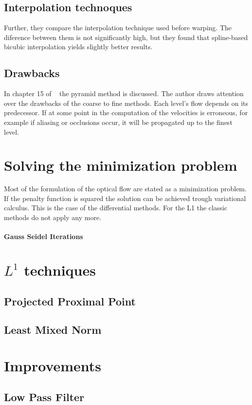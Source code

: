 \documentclass[12pt,a4paper,twoside]{report}
\begin{document}
\subsection{Interpolation technoques} Further, they compare the interpolation technique used before warping.
The diference between them is not significantly high, but they found that spline-based bicubic interpolation yields slightly better results.

\subsection{Drawbacks}In chapter 15 of ~\cite{fleet2006} the pyramid method is discussed. The author draws attention over the drawbacks of the coarse to fine methods. Each level's flow depends on its predecessor. If at some point in the computation of the velocities is erroneous, for example if aliasing or occlusions occur, it will be propagated up to the finest level.
 
\section{Solving the minimization problem}
Most of the formulation of the optical flow are stated as a minimization problem. If the penalty function is squared the solution can be achieved trough variational calculus. This is the case of the differential methods. For the L1 the classic methods do not apply  any more.
\paragraph{Gauss Seidel Iterations}

\section{$L^1$ techniques}
\subsection{Projected Proximal Point}
\subsection{Least Mixed Norm}

\section{Improvements}
\subsection{Low Pass Filter}
\end{document}
